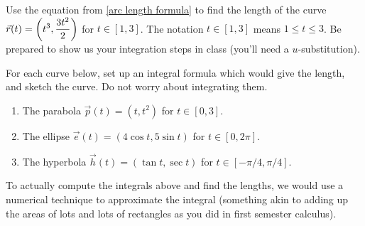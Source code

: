 \begin{problem} 
Use the equation from \ref{arc length formula} to find the length of the curve  $\displaystyle \vec r(t) = \left(t^3,\frac{3t^2}{2}\right)$ for $t\in[1,3]$. The notation $t\in[1,3]$ means $1\leq t\leq 3$. Be prepared to show us your integration steps in class (you'll need a $u$-substitution).
\end{problem}

\begin{problem}
For each curve below, set up an integral formula which would give the length, and sketch the curve. Do not worry about integrating them.  
\begin{enumerate}
\item The parabola $\vec p(t) = (t,t^2)$ for $t\in[0,3]$.
\item The ellipse $\vec e(t) = (4\cos t,5\sin t)$ for $t\in[0,2\pi]$.
\item The hyperbola $\vec h(t) = (\tan t,\sec t)$ for $t\in[-\pi/ 4,\pi/4]$.
\end{enumerate}
\end{problem}
To actually compute the integrals above and find the lengths, we would use a numerical technique to approximate the integral (something akin to adding up the areas of lots and lots of rectangles as you did in first semester calculus).